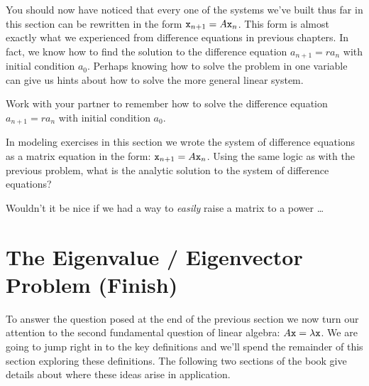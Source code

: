You should now have noticed that every one of the systems we've built thus far in this
section can be rewritten in the form $\texttt{x}_{n+1} = A \texttt{x}_n$.   This form is almost exactly
what we experienced from difference equations in previous chapters.  In fact, we know how
to find the solution to the difference equation $a_{n+1} = r a_n$ with initial condition
$a_0$.  Perhaps knowing how to solve the problem in one variable can give us hints about
how to solve the more general linear system.
\begin{problem}
    Work with your partner to remember how to solve the difference equation $a_{n+1} = r
    a_n$ with initial condition $a_0$. 
\end{problem}
\begin{problem}
    In modeling exercises in this section we wrote the system of difference equations as
    a matrix equation in the form: $\texttt{x}_{n+1} = A \texttt{x}_n$.  Using the same logic as
    with the previous problem, what is the analytic solution to the system of
    difference equations?
\end{problem}


Wouldn't it be nice if we had a way to {\it easily} raise a matrix to a power \dots
        


\section{The Eigenvalue / Eigenvector Problem (Finish)}
To answer the question posed at the end of the previous section we now turn our attention to the second fundamental question of linear algebra: $A \texttt{x} =
\lambda \texttt{x}$.  We are going to jump right in to the key definitions and we'll spend the
remainder of this section exploring these definitions.  The following two sections of the
book give details about where these ideas arise in application.

